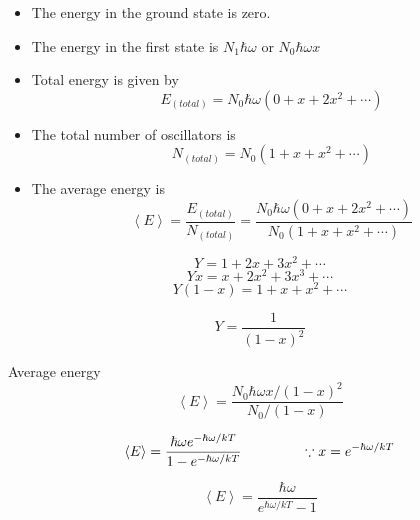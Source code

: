 \documentclass[aspectratio=169]{beamer}
\begin{document}
\begin{frame}

	\begin{itemize}
	
		\item The energy in the ground state is zero.\pause \newline
		\item The energy in the first state is $ N_1 \hbar \omega $ or $ N_0 \hbar \omega x $ \pause \newline
		\item Total energy is given by \[ E_{\left(total \right)} = N_0 \hbar \omega ( 0 + x + 2 x^2 + \cdots ) \] 
	
	\end{itemize}
	
\end{frame}
\begin{frame}
	\begin{itemize}

		\item The total number of oscillators is \[ N_{\left(total \right)} = N_0 ( 1 + x +  x^2 + \cdots ) \]  \pause \newline
		\item  The average energy is \[ \left< E \right> = \frac{E_{\left(total \right)}}{N_{\left(total \right)}} = \dfrac{N_0 \hbar \omega ( 0 + x + 2 x^2 + \cdots )}{N_0 ( 1 + x + x^2 + \cdots )} \] \newline
		
	\end{itemize}
\end{frame}

\begin{frame}


		 \[ Y = 1 + 2 x + 3 x^2 + \cdots  \] \newline
		\[ Yx = x + 2 x ^ 2 + 3 x^3 + \cdots  \] \newline
		 \[ Y(1-x) = 1 + x + x^2 + \cdots  \]

\end{frame}

\begin{frame}

		\[ Y = \dfrac{1}{(1 - x )^2 } \]
		
		 Average energy \[  \left< E \right> = \dfrac{ N_0 \hbar \omega x / (1 - x )^2}{ N_0 / (1 - x )} \] %
\end{frame}

\begin{frame}

		\[ \left< E \right> =  \frac{\hbar \omega e^{-\hbar \omega / kT} }{1 - e^{-\hbar \omega / kT} } \hspace {1.5cm} \because x = e^{-\hbar \omega / kT}  \] \vspace{0.35cm}
		
		\begin{equation}	
		\boxed{ \left< E \right> = \frac{\hbar \omega}{e^{\hbar \omega / kT}-1} }
		\end{equation}
		
\end{frame}
\end{document}
